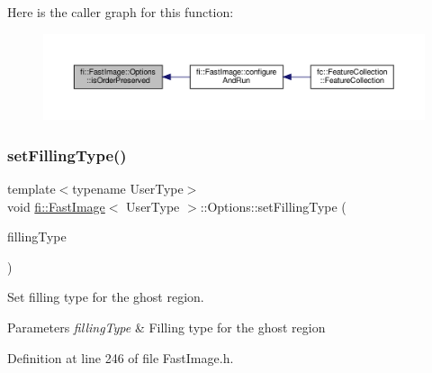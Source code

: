 Here is the caller graph for this function\+:
\nopagebreak
\begin{figure}[H]
\begin{center}
\leavevmode
\includegraphics[width=350pt]{dc/db9/classfi_1_1FastImage_1_1Options_a088e2f97d9c9297fd6151c030820bd62_icgraph}
\end{center}
\end{figure}
\mbox{\label{classfi_1_1FastImage_1_1Options_a6d30e9a1a701156d837cd1693a5c3b1d}} 
\subsubsection{\texorpdfstring{set\+Filling\+Type()}{setFillingType()}}
{\footnotesize\ttfamily template$<$typename User\+Type$>$ \\
void \hyperlink{classfi_1_1FastImage}{fi\+::\+Fast\+Image}$<$ User\+Type $>$\+::Options\+::set\+Filling\+Type (\begin{DoxyParamCaption}\item[{\hyperlink{namespacefi_a6808b618c85d179a330ca388162215bd}{Filling\+Type}}]{filling\+Type }\end{DoxyParamCaption})\hspace{0.3cm}{\ttfamily [inline]}}



Set filling type for the ghost region. 


\begin{DoxyParams}{Parameters}
{\em filling\+Type} & Filling type for the ghost region \\
\hline
\end{DoxyParams}


Definition at line 246 of file Fast\+Image.\+h.

\mbox{\label{classfi_1_1FastImage_1_1Options_a7c0ae60a439a4be02b4600618e2fcebe}} 
